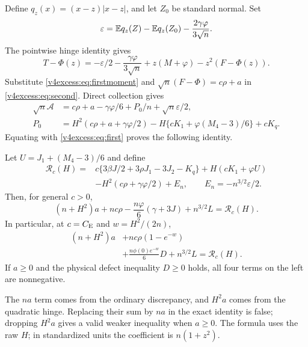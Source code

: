 Define $q_z(x)=(x-z)|x-z|$, and let $Z_0$ be standard normal. Set
\[
 \varepsilon=\mathbb E q_z(Z)-\mathbb E q_z(Z_0)-\frac{2\gamma\varphi}{3\sqrt n}.
\]
The pointwise hinge identity gives
\[
 T-\Phi(z)=-\varepsilon/2-\frac{\gamma\varphi}{3\sqrt n}
                     +z(M+\varphi)-z^2(F-\Phi(z)).
\]
Substitute \eqref{v4excess:eq:firstmoment} and
$\sqrt n(F-\Phi)=c\rho+a$ in \eqref{v4excess:eq:second}. Direct collection gives
\begin{align*}
 \sqrt n\mathcal A&=c\rho+a-\gamma\varphi/6+P_0/n
                                          +\sqrt n\varepsilon/2,\\
 P_0&=H^2(c\rho+a+\gamma\varphi/2)
       -H\{cK_1+\varphi(M_4-3)/6\}+cK_q.
\end{align*}
Equating with \eqref{v4excess:eq:first} proves the following identity.

\begin{theorem}\label{v4excess:thm:identity}
Let $U=J_1+(M_4-3)/6$ and define
\begin{align*}
 \mathcal R_c(H)={}&c\{3\beta J/2+3\rho J_1-3J_2-K_q\}
    +H(cK_1+\varphi U)\\
 &-H^2(c\rho+\gamma\varphi/2)+E_n,
 \qquad E_n=-n^{3/2}\varepsilon/2.
\end{align*}
Then, for general $c>0$,
\begin{equation}\label{v4excess:eq:general}
 (n+H^2)a+nc\rho-\frac{n\varphi}{6}(\gamma+3J)+n^{3/2}L
 =\mathcal R_c(H).
\end{equation}
In particular, at $c=C_{\mathrm E}$ and $w=H^2/(2n)$,
\begin{equation}\label{v4excess:eq:conserved}
 \boxed{\begin{aligned}
 (n+H^2)a&+nc\rho(1-e^{-w})\\
 &+\frac{n\phi(0)e^{-w}}6D+n^{3/2}L=\mathcal R_c(H).
 \end{aligned}}
\end{equation}
If $a\ge0$ and the physical defect inequality $D\ge0$ holds, all four
terms on the left are nonnegative.
\end{theorem}
The $na$ term comes from the ordinary discrepancy, and $H^2a$ comes from
the quadratic hinge. Replacing their sum by $na$ in the exact identity is
false; dropping $H^2a$ gives a valid weaker inequality when $a\ge0$. The formula
uses the raw $H$; in standardized units the coefficient is $n(1+z^2)$.

